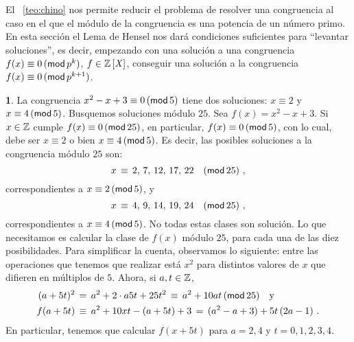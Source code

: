 \theoremstyle{plain}
\newtheorem{teoHensel}{\teoname}[section]

\theoremstyle{definition}
\newtheorem{ejemHensel}[teoHensel]{\ejemname}


El \teorema~\ref{teo:chino} nos permite reducir el
problema de resolver una congruencia al caso en el
que el m\'odulo de la congruencia es una potencia de
un n\'umero primo. En esta secci\'on el Lema de Hensel
nos dar\'a condiciones suficientes para ``levantar
soluciones'', es decir, empezando con una soluci\'on
a una congruencia $f(x)\equiv 0\tmodulo[p^k]$,
$f\in\polinomios\Enteros$, conseguir una soluci\'on a
la congruencia $f(x)\equiv 0\tmodulo[p^{k+1}]$.

\begin{ejemHensel}\label{ejem:hensel:cinco}
	La congruencia $x^2-x+3\equiv 0\tmodulo[5]$ tiene dos
	soluciones: $x\equiv 2$ y $x\equiv 4\tmodulo[5]$.
	Busquemos soluciones m\'odulo $25$. Sea $f(x)=x^2-x+3$.
	Si $x\in\Enteros$ cumple $f(x)\equiv 0\tmodulo[25]$,
	en particular, $f(x)\equiv 0\tmodulo[5]$, con lo cual,
	debe ser $x\equiv 2$ o bien $x\equiv 4\tmodulo[5]$.
	Es decir, las posibles soluciones a la congruencia
	m\'odulo $25$ son:
	\begin{displaymath}
		x\,\equiv\,2,\,7,\,12,\,17,\,22\modulo[25]
		\dispcomma
	\end{displaymath}
	correspondientes a $x\equiv 2\tmodulo[5]$, y
	\begin{displaymath}
		x\,\equiv\,4,\,9,\,14,\,19,\,24\modulo[25]
		\dispcomma
	\end{displaymath}
	correspondientes a $x\equiv 4\tmodulo[5]$.
	No todas estas clases son soluci\'on.
	Lo que necesitamos es calcular la clase de $f(x)$
	m\'odulo $25$, para cada una de las diez posibilidades.
	Para simplificar la cuenta, observamos lo siguiente:
	entre las operaciones que tenemos que realizar est\'a
	$x^2$ para distintos valores de $x$ que difieren en
	m\'ultiplos de $5$. Ahora, si $a,t\in\Enteros$,
	\begin{displaymath}
		\begin{aligned}
			(a+5t)^2 & \,=\,a^2+2\cdot a5t+25t^2
				\,\equiv\,a^2+10at\tmodulo[25]
				\dispand \\
			f(a+5t) & \,\equiv\,
				a^2+10xt-(a+5t)+3 \,=\,
				(a^2-a+3) + 5t\,(2a-1)
			\dispstop
		\end{aligned}
	\end{displaymath}
	En particular, tenemos que calcular $f(x+5t)$ para
	$a=2,4$ y $t=0,1,2,3,4$.

\end{ejemHensel}
